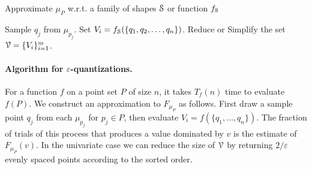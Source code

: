 \documentclass{journal}
\newcommand{\eps}{\varepsilon}
\newcommand{\Eu}[1]{\ensuremath{\EuScript{#1}}}
\begin{document}
\begin{algorithm}[h!!t]
\caption{Approximate $\mu_P$ w.r.t. a family of shapes $\Eu{S}$ or function $f_{\Eu{S}}$
\label{alg:rand-draw}}
\begin{algorithmic}[1]
\FOR {$i = 1$ \textbf{to} $m = O((1/\eps^2) (\nu + \log (1/\delta)))$}
    \STATE Sample $q_j$ from $\mu_{p_j}$.
  \ENDFOR
  \STATE Set $V_i = f_{\Eu{S}}(\{q_1, q_2, \ldots, q_n\})$.
\ENDFOR
\STATE Reduce or Simplify the set $\Eu{V} = \{ V_i\}_{i=1}^m$.
\end{algorithmic}
\end{algorithm}




\paragraph{Algorithm for $\eps$-quantizations.}
\label{sec:algQ}
For a function $f$ on a point set $P$ of size $n$, it takes $T_f(n)$ time to evaluate $f(P)$.
We construct an approximation to $F_{\mu_P}$ 
as follows.  First draw a sample point $q_j$ from each $\mu_{p_j}$ for $p_j \in P$, then evaluate $V_i = f(\{q_1, \ldots, q_n\})$.  The fraction of trials of this process that produces a value dominated by $v$ is the estimate of $F_{\mu_P}(v)$.
In the univariate case we can reduce the size of $\Eu{V}$ by returning $2/\eps$ evenly spaced points according to the sorted order.
\end{document}
